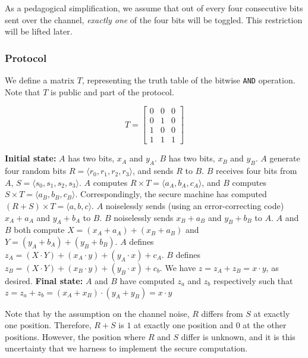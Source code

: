 \documentclass[11pt]{article}
\begin{document}
As a pedagogical simplification, we assume that out of every four consecutive bits sent over the channel, \textit{exactly one} of the four bits will be toggled. This restriction will be lifted later. 

\subsubsection{Protocol}

We define a matrix $T$, representing the truth table of the bitwise \texttt{AND} operation. Note that $T$ is public and part of the protocol.

\[T = 
\begin{bmatrix}
0 & 0 & 0 \\
0 & 1 & 0 \\
1 & 0 & 0 \\
1 & 1 & 1
\end{bmatrix}
\]

\begin{algorithm}
\label{a-enc-h}
\begin{algorithmic}[1]
\State \textbf{Initial state:} $A$ has two bits, $x_A$ and $y_A$. $B$ has two bits, $x_B$ and $y_B$.
\State $A$ generate four random bits $R = \langle r_0, r_1, r_2, r_3 \rangle$, and sends $R$ to $B$.
\State $B$ receives four bits from $A$, $S = \langle  s_0, s_1, s_2, s_3 \rangle$.
\State $A$ computes $R \times T = \langle a_A, b_A, c_A \rangle$, and $B$ computes $S \times T = \langle a_B, b_B, c_B \rangle$. Correspondingly, the secure machine has computed $(R + S) \times T = \langle a, b, c \rangle $.
\State $A$ noiselessly sends (using an error-correcting code) $x_A + a_A$ and $y_A + b_A$ to $B$. $B$ noiselessly sends $x_B + a_B$ and $y_B + b_B$ to $A$.
\State $A$ and $B$ both compute $X = (x_A + a_A) + (x_B + a_B)$ and $Y = (y_A + b_A) + (y_B + b_B)$.
\State $A$ defines $z_A = (X \cdot Y) + (x_A \cdot y) + (y_A \cdot x) + c_A$.
\State $B$ defines $z_B = (X \cdot Y) + (x_B \cdot y) + (y_B \cdot x) + c_b$. We have $z = z_A + z_B = x \cdot y$, as desired.
\State \textbf{Final state:} $A$ and $B$ have computed $z_a$ and $z_b$ respectively such that $z = z_a + z_b = (x_A + x_B) \cdot (y_A + y_B) = x \cdot y$
\end{algorithmic}
\end{algorithm}

\pagebreak

Note that by the assumption on the channel noise, $R$ differs from $S$ at exactly one position. Therefore, $R + S$ is $1$ at exactly one position and $0$ at the other positions. However, the position where $R$ and $S$ differ is unknown, and it is this uncertainty that we harness to implement the secure computation. \\
\end{document}
